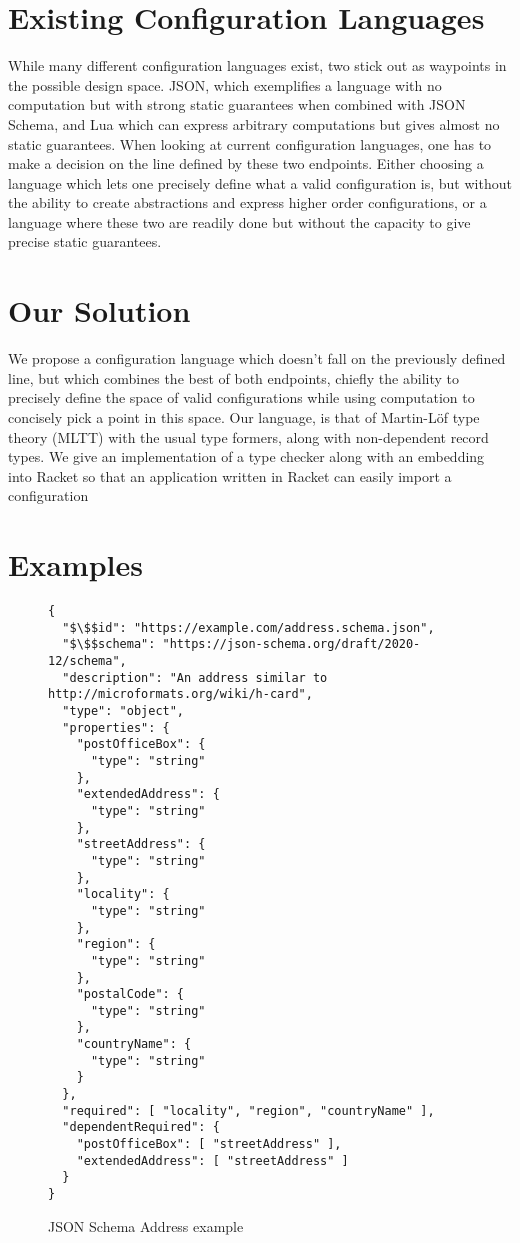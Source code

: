 \documentclass{article}
\begin{document}
\section{Existing Configuration Languages}

While many different configuration languages exist, two stick out as waypoints in the possible design space.
JSON, which exemplifies a language with no computation but with strong static guarantees when combined with JSON Schema, and Lua which can express arbitrary computations but gives almost no static guarantees.
When looking at current configuration languages, one has to make a decision on the line defined by these two endpoints.
Either choosing a language which lets one precisely define what a valid configuration is, but without the ability to create abstractions and express higher order configurations, or a language where these two are readily done but without the capacity to give precise static guarantees.

\section{Our Solution}


We propose a configuration language which doesn't fall on the previously defined line, but which combines the best of both endpoints, chiefly the ability to precisely define the space of valid configurations while using computation to concisely pick a point in this space.
Our language, is that of Martin-Löf type theory (MLTT) with the usual type formers, along with non-dependent record types.
We give an implementation of a type checker along with an embedding into Racket so that an application written in Racket can easily import a configuration

\section{Examples}

\begin{figure}[!h]
  {\scriptsize
  \begin{lstlisting}
{
  "$\$$id": "https://example.com/address.schema.json",
  "$\$$schema": "https://json-schema.org/draft/2020-12/schema",
  "description": "An address similar to http://microformats.org/wiki/h-card",
  "type": "object",
  "properties": {
    "postOfficeBox": {
      "type": "string"
    },
    "extendedAddress": {
      "type": "string"
    },
    "streetAddress": {
      "type": "string"
    },
    "locality": {
      "type": "string"
    },
    "region": {
      "type": "string"
    },
    "postalCode": {
      "type": "string"
    },
    "countryName": {
      "type": "string"
    }
  },
  "required": [ "locality", "region", "countryName" ],
  "dependentRequired": {
    "postOfficeBox": [ "streetAddress" ],
    "extendedAddress": [ "streetAddress" ]
  }
}
  \end{lstlisting}
  }
  \caption{JSON Schema Address example}
  \label{fig:js-addr}
\end{figure}
\end{document}
